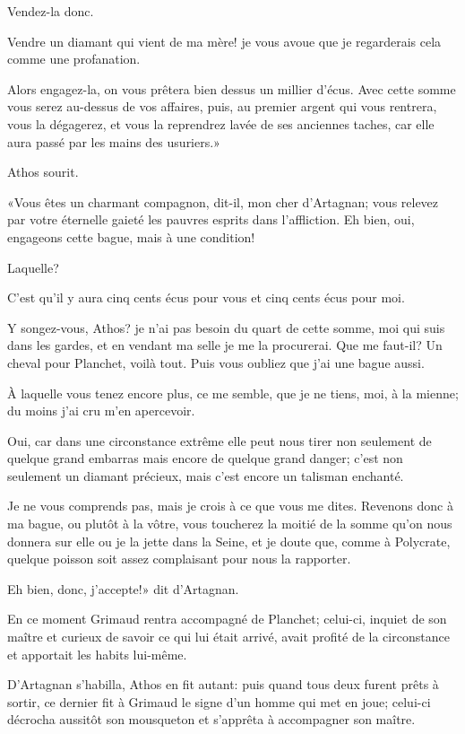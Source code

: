 \speak  Vendez-la donc. 

\speak  Vendre un diamant qui vient de ma mère! je vous avoue que je regarderais cela comme une profanation. 

\speak  Alors engagez-la, on vous prêtera bien dessus un millier d'écus. Avec cette somme vous serez au-dessus de vos affaires, puis, au premier argent qui vous rentrera, vous la dégagerez, et vous la reprendrez lavée de ses anciennes taches, car elle aura passé par les mains des usuriers.» 

Athos sourit. 

«Vous êtes un charmant compagnon, dit-il, mon cher d'Artagnan; vous relevez par votre éternelle gaieté les pauvres esprits dans l'affliction. Eh bien, oui, engageons cette bague, mais à une condition! 

\speak  Laquelle? 

\speak  C'est qu'il y aura cinq cents écus pour vous et cinq cents écus pour moi. 

\speak  Y songez-vous, Athos? je n'ai pas besoin du quart de cette somme, moi qui suis dans les gardes, et en vendant ma selle je me la procurerai. Que me faut-il? Un cheval pour Planchet, voilà tout. Puis vous oubliez que j'ai une bague aussi. 

\speak  À laquelle vous tenez encore plus, ce me semble, que je ne tiens, moi, à la mienne; du moins j'ai cru m'en apercevoir. 

\speak  Oui, car dans une circonstance extrême elle peut nous tirer non seulement de quelque grand embarras mais encore de quelque grand danger; c'est non seulement un diamant précieux, mais c'est encore un talisman enchanté. 

\speak  Je ne vous comprends pas, mais je crois à ce que vous me dites. Revenons donc à ma bague, ou plutôt à la vôtre, vous toucherez la moitié de la somme qu'on nous donnera sur elle ou je la jette dans la Seine, et je doute que, comme à Polycrate, quelque poisson soit assez complaisant pour nous la rapporter. 

\speak  Eh bien, donc, j'accepte!» dit d'Artagnan. 

En ce moment Grimaud rentra accompagné de Planchet; celui-ci, inquiet de son maître et curieux de savoir ce qui lui était arrivé, avait profité de la circonstance et apportait les habits lui-même. 

D'Artagnan s'habilla, Athos en fit autant: puis quand tous deux furent prêts à sortir, ce dernier fit à Grimaud le signe d'un homme qui met en joue; celui-ci décrocha aussitôt son mousqueton et s'apprêta à accompagner son maître. 

